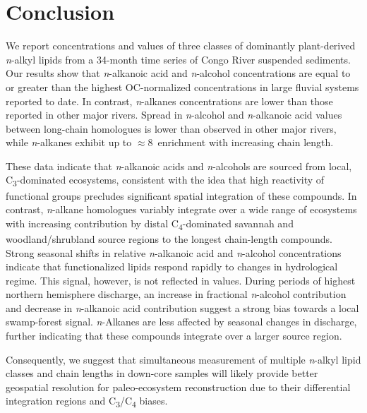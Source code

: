 \section{Conclusion}

We report concentrations and  values of three classes of dominantly plant-derived \textit{n}-alkyl lipids from a 34-month time series of Congo River suspended sediments. Our results show that \textit{n}-alkanoic acid and \textit{n}-alcohol concentrations are equal to or greater than the highest OC-normalized concentrations in large fluvial systems reported to date. In contrast, \textit{n}-alkanes concentrations are lower than those reported in other major rivers. Spread in \textit{n}-alcohol and \textit{n}-alkanoic acid  values between long-chain homologues is lower than observed in other major rivers, while \textit{n}-alkanes exhibit up to $\approx 8$\textperthousand\ enrichment with increasing chain length.

These data indicate that \textit{n}-alkanoic acids and \textit{n}-alcohols are sourced from local, C\textsubscript{3}-dominated ecosystems, consistent with the idea that high reactivity of functional groups precludes significant spatial integration of these compounds. In contrast, \textit{n}-alkane homologues variably integrate over a wide range of ecosystems with increasing contribution by distal C\textsubscript{4}-dominated savannah and woodland/shrubland source regions to the longest chain-length compounds. Strong seasonal shifts in relative \textit{n}-alkanoic acid and \textit{n}-alcohol concentrations indicate that functionalized lipids respond rapidly to changes in hydrological regime. This signal, however, is not reflected in  values. During periods of highest northern hemisphere discharge, an increase in fractional \textit{n}-alcohol contribution and decrease in \textit{n}-alkanoic acid contribution suggest a strong bias towards a local swamp-forest signal. \textit{n}-Alkanes are less affected by seasonal changes in discharge, further indicating that these compounds integrate over a larger source region.

Consequently, we suggest that simultaneous measurement of multiple \textit{n}-alkyl lipid classes and chain lengths in down-core samples will likely provide better geospatial resolution for paleo-ecosystem reconstruction due to their differential integration regions and C\textsubscript{3}/C\textsubscript{4} biases.


